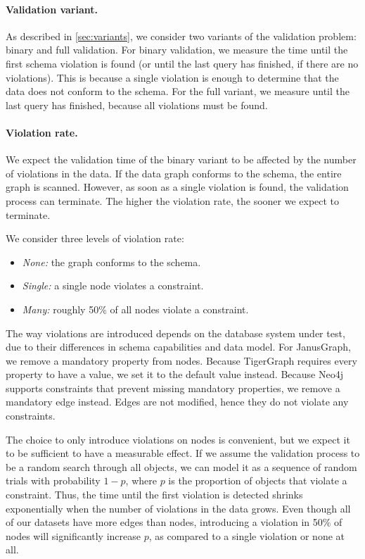\documentclass{report}
\theoremstyle{definition}
\begin{document}
\paragraph{Validation variant.} As described in \autoref{sec:variants}, we consider two variants of the validation problem: binary and full validation. For binary validation, we measure the time until the first schema violation is found (or until the last query has finished, if there are no violations). This is because a single violation is enough to determine that the data does not conform to the schema. For the full variant, we measure until the last query has finished, because all violations must be found.

\paragraph{Violation rate.} We expect the validation time of the binary variant to be affected by the number of violations in the data. If the data graph conforms to the schema, the entire graph is scanned. However, as soon as a single violation is found, the validation process can terminate. The higher the violation rate, the sooner we expect to terminate.

We consider three levels of violation rate:

\begin{itemize}
  \item \emph{None:} the graph conforms to the schema.
  \item \emph{Single:} a single node violates a constraint.
  \item \emph{Many:} roughly 50\% of all nodes violate a constraint.
\end{itemize}

The way violations are introduced depends on the database system under test, due to their differences in schema capabilities and data model. For JanusGraph, we remove a mandatory property from nodes. Because TigerGraph requires every property to have a value, we set it to the default value instead. Because Neo4j supports constraints that prevent missing mandatory properties, we remove a mandatory edge instead. Edges are not modified, hence they do not violate any constraints.

The choice to only introduce violations on nodes is convenient, but we expect it to be sufficient to have a measurable effect. If we assume the validation process to be a random search through all objects, we can model it as a sequence of random trials with probability $1-p$, where $p$ is the proportion of objects that violate a constraint. Thus, the time until the first violation is detected shrinks exponentially when the number of violations in the data grows. Even though all of our datasets have more edges than nodes, introducing a violation in 50\% of nodes will significantly increase $p$, as compared to a single violation or none at all.
\end{document}
